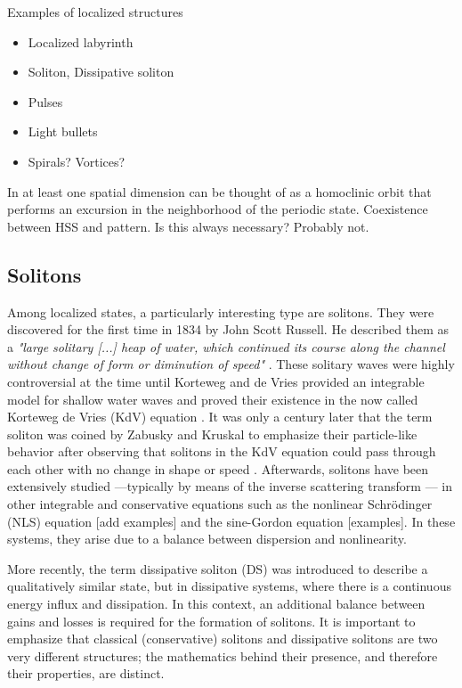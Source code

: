 Examples of localized structures
\begin{itemize}
    \item Localized labyrinth
    \item Soliton, Dissipative soliton
    \item Pulses
    \item Light bullets
    \item Spirals? Vortices?
\end{itemize}

In at least one spatial dimension can be thought of as a homoclinic orbit that performs
an excursion in the neighborhood of the periodic state. Coexistence between HSS and pattern.
Is this always necessary? Probably not.

\subsection{Solitons}

Among localized states, a particularly interesting type are solitons. They were discovered
 for the first time in 1834 by John Scott Russell. He described them 
 as a {\em "large solitary [...] heap of water, which continued its course along the channel without change of form
or diminution of speed"} \cite{russell1845report}. These solitary waves were highly controversial
at the time until Korteweg and de Vries provided an integrable model for shallow water waves
and proved their existence in the now called Korteweg de Vries (KdV) equation \cite{korteweg1895xli}.
It was only a century later that the term soliton was coined by Zabusky and Kruskal
to emphasize their particle-like behavior after observing that solitons in the KdV equation could pass through each
other with no change in shape or speed \cite{zabusky1965interaction}. Afterwards, solitons 
have been extensively studied{ }---typically by means of the inverse scattering 
transform \cite{gardner1967method, gardner1974korteweg}---
in other integrable and conservative equations such as the nonlinear Schrödinger (NLS)
equation [add examples] and the sine-Gordon equation [examples]. 
In these systems, they arise due to a balance between dispersion and nonlinearity. 


More recently, the term dissipative soliton (DS) was introduced to describe a qualitatively
similar state, but in dissipative systems, where there is a continuous energy influx and 
dissipation. In this context, an additional balance between gains and losses is required for the formation
of solitons. It is important to emphasize that classical (conservative) solitons and dissipative solitons
are two very different structures; the mathematics behind their presence, and therefore their
properties, are distinct.

